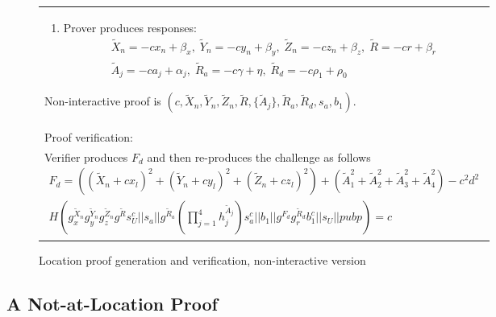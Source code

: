 \documentclass{article}
\begin{document}
\begin{figure}[!htb]
\begin{tabular}{|p{\linewidth}|}
\begin{enumerate}
\item
  Prover produces responses:
\begin{multline}
  \tilde X_n = -c x_n + \beta_x,  \;
  \tilde Y_n = -c y_n + \beta_y,  \;
  \tilde Z_n = -c z_n + \beta_z,   \;
  \tilde R = -c r + \beta_r   \\
  \tilde A_j = -c a_j + \alpha_j, \;
  \tilde R_a = -c \gamma + \eta,   \;
  \tilde R_d = -c \rho_1 + \rho_0
\end{multline}
\end{enumerate}
Non-interactive proof is
$(c, \tilde X_n, \tilde Y_n, \tilde Z_n, \tilde R, \{\tilde A_j\}, \tilde R_a, \tilde R_d, s_a, b_1)$.
\\
Proof verification:\\
Verifier produces $F_d$ and then re-produces the challenge as follows
%
\begin{multline}
\label{verf-chash}
  F_d = ((\tilde X_n + c x_l)^2 + (\tilde Y_n + c y_l)^2 + (\tilde Z_n + c z_l)^2) + (\tilde A_1^2 + \tilde A_2^2 + \tilde A_3^2 + \tilde A_4^2) - c^2 d^2 \\
  H(g_x^{\tilde X_n} g_y^{\tilde Y_n} g_z^{\tilde Z_n} g^{\tilde R} s_U^{c} ||
    s_a ||
    g^{\tilde R_a} (\prod_{j=1}^4 h_j^{\tilde A_j}) s_a^{c} ||
    b_1 ||
    g^{F_d} g_r^{\tilde R_d} b_1^c ||
    s_U ||
    pubp)
  = c
\end{multline}
\\
\hline
\end{tabular}
\caption{Location proof generation and verification, non-interactive version}
\label{ni_fig}
\end{figure}


\subsection{A Not-at-Location Proof}
\end{document}
